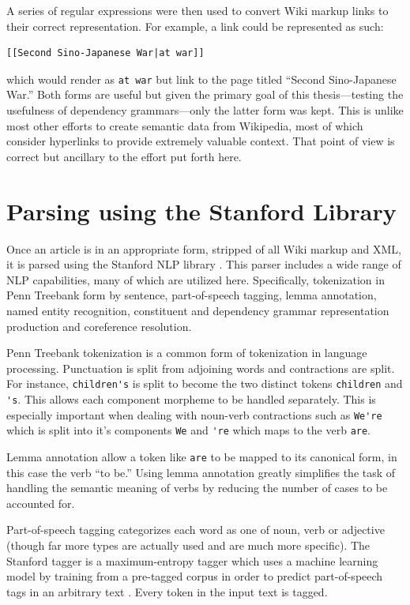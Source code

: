 A series of regular expressions were then used to convert Wiki markup links to their correct representation.  For example, a link could be represented as such: 
\begin{verbatim}
[[Second Sino-Japanese War|at war]]
\end{verbatim} which would render as \verb|at war| but link to the page titled ``Second Sino-Japanese War.''  Both forms are useful but given the primary goal of this thesis---testing the usefulness of dependency grammars---only the latter form was kept.  This is unlike most other efforts to create semantic data from Wikipedia, most of which consider hyperlinks to provide extremely valuable context.  That point of view is correct but ancillary to the effort put forth here.

\section{Parsing using the Stanford Library}
\label{sec:stanford-lib}

Once an article is in an appropriate form, stripped of all Wiki markup and XML, it is parsed using the Stanford NLP library \cite{nlp}.  This parser includes a wide range of NLP capabilities, many of which are utilized here.  Specifically, tokenization in Penn Treebank form by sentence, part-of-speech tagging, lemma annotation, named entity recognition, constituent and dependency grammar representation production and coreference resolution.

Penn Treebank tokenization is a common form of tokenization in language processing.  Punctuation is split from adjoining words and contractions are split. For instance, \verb|children's| is split to become the two distinct tokens \verb|children| and \verb|'s|.  This allows each component morpheme to be handled separately.  This is especially important when dealing with noun-verb contractions such as \verb|We're| which is split into it's components \verb|We| and \verb|'re| which maps to the verb \verb|are|.

Lemma annotation allow a token like \verb|are| to be mapped to its canonical form, in this case the verb ``to be.''  Using lemma annotation greatly simplifies the task of handling the semantic meaning of verbs by reducing the number of cases to be accounted for.  

Part-of-speech tagging categorizes each word as one of noun, verb or adjective (though far more types are actually used and are much more specific).  The Stanford tagger is a maximum-entropy tagger which uses a machine learning model by training from a pre-tagged corpus in order to predict part-of-speech tags in an arbitrary text \cite{Ratnaparkhi96amaximum}.  Every token in the input text is tagged.

